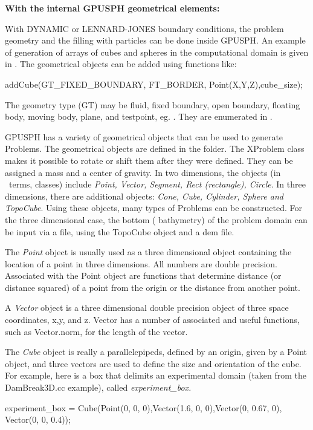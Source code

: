 \documentclass{../GPUSPHtemplate}
\begin{document}
\textbf{With the internal GPUSPH geometrical elements:}

With DYNAMIC or LENNARD-JONES boundary conditions, the
problem geometry and the filling with particles can be done
inside GPUSPH. An example of generation of arrays
of cubes and spheres in the computational domain is given in
. 
The geometrical objects can be added using functions like:
\begin{ccode}
addCube(GT_FIXED_BOUNDARY, FT_BORDER,
             Point(X,Y,Z),cube_size);
\end{ccode}
The geometry type (GT) may be fluid, fixed boundary, open boundary, 
floating body, moving body, plane, and testpoint, eg. . 
They are enumerated in .


GPUSPH has a variety of geometrical objects that can be used to generate Problems.
The geometrical objects are defined in the  folder.
The XProblem class makes it possible to rotate or shift them after they were defined.
They can be assigned a mass and a center of gravity.
In two dimensions, the objects (in \cpp\ terms, classes) include {\em
Point, Vector, Segment, Rect (rectangle), Circle}. In three
dimensions, there are additional objects: {\em Cone, Cube, Cylinder,
Sphere and TopoCube}. Using these objects, many types of Problems can
be constructed. For the three dimensional case, the bottom (
bathymetry) of the problem domain can be input via a file, using the
TopoCube object and a dem file.


The {\em Point} object is usually used as a three dimensional object
containing the location of a point in three dimensions. All numbers are
double precision. Associated with the Point object are functions that
determine distance (or distance squared) of a point from the origin or
the distance from another point.


A {\em Vector} object is a three dimensional double precision object of
three space coordinates, x,y, and z. Vector has a number of associated
and useful functions, such as Vector.norm, for the length of the vector.


The {\em Cube} object is really a parallelepipeds, defined by an origin,
given by a Point object, and three vectors are used to define the size
and orientation of the cube. For example, here is a box that delimits
an experimental domain (taken from the DamBreak3D.cc example), called
{\em experiment\_box.}

\noindent experiment\_box = Cube(Point(0, 0, 0),Vector(1.6, 0,
0),Vector(0, 0.67, 0), Vector(0, 0, 0.4));
\end{document}
